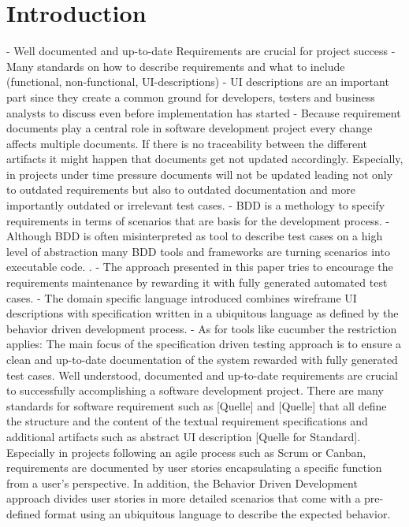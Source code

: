 \documentclass{sig-alternate-05-2015}
\begin{document}

\section{Introduction}
-	Well documented and up-to-date Requirements are crucial for project success
-	Many standards on how to describe requirements and what to include (functional, non-functional, UI-descriptions)
-	UI descriptions are an important part since they create a common ground for developers, testers and business analysts to discuss even before implementation has started
-	Because requirement documents play a central role in software development project every change affects multiple documents. If there is no traceability between the different artifacts it might happen that documents get not updated accordingly. Especially, in projects under time pressure documents will not be updated leading not only to outdated requirements but also to outdated documentation and more importantly outdated or irrelevant test cases.
- BDD is a methology to specify requirements in terms of scenarios that are basis for the development process.
- Although BDD is often misinterpreted as tool to describe test cases on a high level of abstraction many BDD tools and frameworks are turning scenarios into executable code.
. 
- The approach presented in this paper tries to encourage the requirements maintenance by rewarding it with fully generated automated test cases.
-	The domain specific language introduced combines wireframe UI descriptions with specification written in a ubiquitous language as defined by the behavior driven development process.
-	As for tools like cucumber the restriction applies: The main focus of the specification driven testing approach is to ensure a clean and up-to-date documentation of the system rewarded with fully generated test cases.
Well understood, documented and up-to-date requirements are crucial to successfully accomplishing a software development project.
There are many standards for software requirement such as [Quelle] and [Quelle] that all define the structure and the content of the textual requirement specifications and additional artifacts such as abstract UI description [Quelle for Standard].
Especially in projects following an agile process such as Scrum or Canban, requirements are documented by user stories encapsulating a specific function from a user’s perspective.
In addition, the Behavior Driven Development approach divides user stories in more detailed scenarios that come with a pre-defined format using an ubiquitous language to describe the expected behavior.
\end{document}

